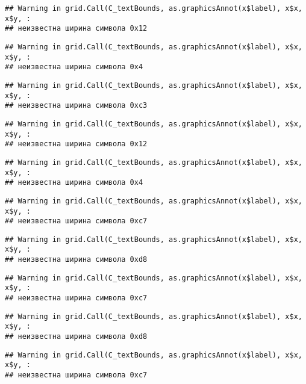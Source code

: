 \documentclass[
]{article}
\begin{document}
\begin{verbatim}
## Warning in grid.Call(C_textBounds, as.graphicsAnnot(x$label), x$x, x$y, :
## неизвестна ширина символа 0x12
\end{verbatim}

\begin{verbatim}
## Warning in grid.Call(C_textBounds, as.graphicsAnnot(x$label), x$x, x$y, :
## неизвестна ширина символа 0x4
\end{verbatim}

\begin{verbatim}
## Warning in grid.Call(C_textBounds, as.graphicsAnnot(x$label), x$x, x$y, :
## неизвестна ширина символа 0xc3
\end{verbatim}

\begin{verbatim}
## Warning in grid.Call(C_textBounds, as.graphicsAnnot(x$label), x$x, x$y, :
## неизвестна ширина символа 0x12
\end{verbatim}

\begin{verbatim}
## Warning in grid.Call(C_textBounds, as.graphicsAnnot(x$label), x$x, x$y, :
## неизвестна ширина символа 0x4
\end{verbatim}

\begin{verbatim}
## Warning in grid.Call(C_textBounds, as.graphicsAnnot(x$label), x$x, x$y, :
## неизвестна ширина символа 0xc7
\end{verbatim}

\begin{verbatim}
## Warning in grid.Call(C_textBounds, as.graphicsAnnot(x$label), x$x, x$y, :
## неизвестна ширина символа 0xd8
\end{verbatim}

\begin{verbatim}
## Warning in grid.Call(C_textBounds, as.graphicsAnnot(x$label), x$x, x$y, :
## неизвестна ширина символа 0xc7
\end{verbatim}

\begin{verbatim}
## Warning in grid.Call(C_textBounds, as.graphicsAnnot(x$label), x$x, x$y, :
## неизвестна ширина символа 0xd8
\end{verbatim}

\begin{verbatim}
## Warning in grid.Call(C_textBounds, as.graphicsAnnot(x$label), x$x, x$y, :
## неизвестна ширина символа 0xc7
\end{verbatim}
\end{document}
